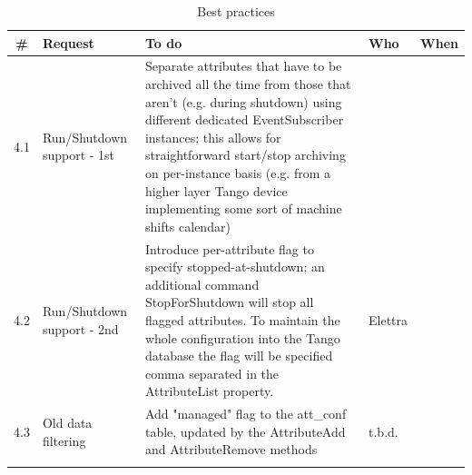 \documentclass[11pt,a4paper]{article}
\begin{document}
\begin{longtable}{|c|p{6.0cm}|p{6.0cm}|p{1.0cm}|p{1.4cm}|}
	\hline
	\bf{\#} & \bf{Request} & \bf{To do} & \bf{Who} & \bf{When} \\
	\hline
	\endhead
	4.1 &
	Run/Shutdown support - 1st &
	Separate attributes that have to be archived all the time from
	those that aren't (e.g. during shutdown) using different dedicated 
	EventSubscriber instances; this allows for straightforward
	start/stop archiving on per-instance basis (e.g. from a higher layer
	Tango device implementing some sort of machine shifts calendar) &
	&
	\\
	\hline
	4.2 &
	Run/Shutdown support  - 2nd&
	Introduce per-attribute flag to specify stopped-at-shutdown; an
	additional command StopForShutdown will stop all flagged attributes.
	To maintain the whole configuration into the Tango database the
	flag will be specified comma separated in the AttributeList property. &
	Elettra &
	\\
	\hline
	4.3 &
	Old data filtering &
	Add "managed" flag to the att\_conf table, updated by the AttributeAdd and
	AttributeRemove methods &
	t.b.d. &
	\\
	\hline
	\caption{Best practices}
	\label{tab:best-practice}
\end{longtable}
\end{document}
